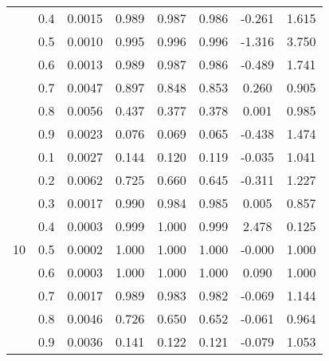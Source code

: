 \documentclass[11pt,a4paper]{report}
\begin{document}
\begin{longtable}{ | c | c || c | c | c | c | c | c | }
 & 0.4 & 0.0015 & 0.989 & 0.987 & 0.986 & -0.261 & 1.615 \\
 & 0.5 & 0.0010 & 0.995 & 0.996 & 0.996 & -1.316 & 3.750 \\
 & 0.6 & 0.0013 & 0.989 & 0.987 & 0.986 & -0.489 & 1.741 \\
 & 0.7 & 0.0047 & 0.897 & 0.848 & 0.853 & 0.260 & 0.905 \\
 & 0.8 & 0.0056 & 0.437 & 0.377 & 0.378 & 0.001 & 0.985 \\
 & 0.9 & 0.0023 & 0.076 & 0.069 & 0.065 & -0.438 & 1.474 \\
 \hline
\multirow{9}{*}{10} & 0.1 & 0.0027 & 0.144 & 0.120 & 0.119 & -0.035 & 1.041 \\
 & 0.2 & 0.0062 & 0.725 & 0.660 & 0.645 & -0.311 & 1.227 \\
 & 0.3 & 0.0017 & 0.990 & 0.984 & 0.985 & 0.005 & 0.857 \\
 & 0.4 & 0.0003 & 0.999 & 1.000 & 0.999 & 2.478 & 0.125 \\
 & 0.5 & 0.0002 & 1.000 & 1.000 & 1.000 & -0.000 & 1.000 \\
 & 0.6 & 0.0003 & 1.000 & 1.000 & 1.000 & 0.090 & 1.000 \\
 & 0.7 & 0.0017 & 0.989 & 0.983 & 0.982 & -0.069 & 1.144 \\
 & 0.8 & 0.0046 & 0.726 & 0.650 & 0.652 & -0.061 & 0.964 \\
 & 0.9 & 0.0036 & 0.141 & 0.122 & 0.121 & -0.079 & 1.053 \\
 \hline
\hline
\end{longtable}
\end{document}
